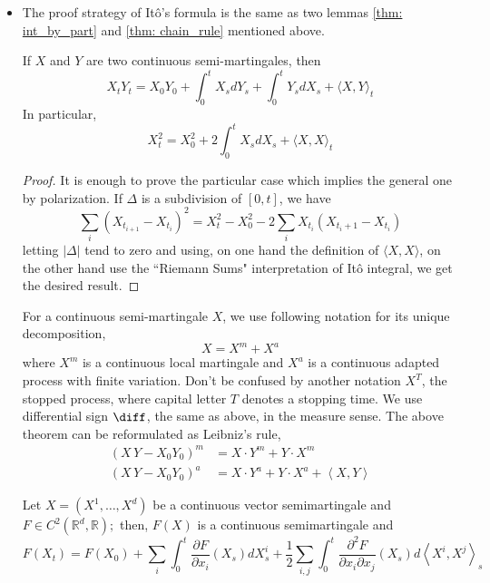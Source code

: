\begin{itemize}
\begin{proof}
\end{proof}
\item 
The proof strategy of It\^o's formula is the same as two lemmas \ref{thm: int_by_part} and \ref{thm: chain_rule} mentioned above.
\begin{proposition}
	If $X$ and $Y$ are two continuous semi-martingales, then
	\[ X_{t} Y_{t}=X_{0} Y_{0}+\int_{0}^{t} X_{s} d Y_{s}+\int_{0}^{t} Y_{s} d X_{s}+\langle X, Y\rangle_{t} \] In particular,
	\[ X_{t}^{2}=X_{0}^{2}+2 \int_{0}^{t} X_{s} d X_{s}+\langle X, X\rangle_{t} \]
\end{proposition}
\begin{proof}
	It is enough to prove the particular case which implies the general one by polarization. If $\Delta$ is a subdivision of $[0, t]$, we have \[ \sum_{i}\left(X_{t_{i+1}}-X_{t_{i}}\right)^{2}=X_{t}^{2}-X_{0}^{2}-2 \sum_{i} X_{t_{i}}\left(X_{t_{i}+1}-X_{t_{i}}\right) \] letting $|\Delta|$ tend to zero and using, on one hand the definition of $\langle X, X\rangle$, on the other hand use the ``Riemann Sums" interpretation of It\^o integral, we get the desired result.
\end{proof}
\begin{remark}
	For a continuous semi-martingale $ X $, we use following notation for its unique decomposition,
	\[ X = X^m + X^a \]
	where $ X^m $ is a continuous local martingale and  $ X^a $ is a continuous adapted process with finite variation. Don't be confused by another notation $ X^T $, the stopped process, where capital letter $ T $ denotes a stopping time.
	We use differential sign $ \diff $, the same as above, in the measure sense.
	The above theorem can be reformulated as Leibniz's rule,
	\[ 
	\begin{aligned}
	(X\,Y -X_0 Y_0)^m &= X\cdot Y^m +Y\cdot X^m\\
	(X\,Y -X_0 Y_0)^a &= X\cdot Y^a +Y\cdot X^a +\left\langle X,Y \right\rangle 
	\end{aligned}
	\]
\end{remark}
\begin{theorem}
	 Let $X=\left(X^{1}, \ldots, X^{d}\right)$ be a continuous vector semimartingale and $F \in C^{2}\left(\mathbb{R}^{d}, \mathbb{R}\right) ;$ then, $F(X)$ is a continuous semimartingale and
	\[ F\left(X_{t}\right)=F\left(X_{0}\right)+\sum_{i} \int_{0}^{t} \frac{\partial F}{\partial x_{i}}\left(X_{s}\right) d X_{s}^{i}+\frac{1}{2} \sum_{i, j} \int_{0}^{t} \frac{\partial^{2} F}{\partial x_{i} \partial x_{j}}\left(X_{s}\right) d\left\langle X^{i}, X^{j}\right\rangle_{s} \]

\end{theorem}
\end{itemize}
